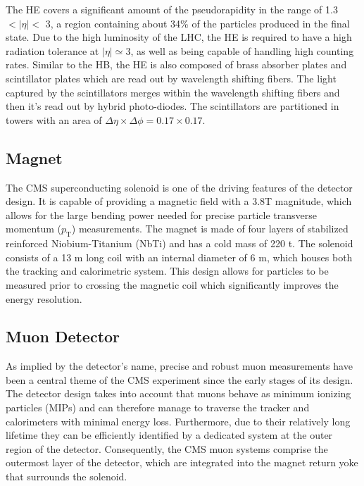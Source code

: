 The HE covers a significant amount of the pseudorapidity in the range of 1.3 $< |\eta| <$ 3, a region containing about 34\% of the particles produced in the final state. Due to the high luminosity of the LHC, the HE is required to have a high radiation tolerance at $|\eta| \simeq 3$, as well as being capable of handling high counting rates. Similar to the HB, the HE is also composed of brass absorber plates and scintillator plates which are read out by wavelength shifting fibers. The light captured by the scintillators merges within the wavelength shifting fibers and then it's read out by hybrid photo-diodes. The scintillators are partitioned in towers with an area of $\Delta\eta\times\Delta\phi = 0.17\times0.17$.\\

\subsection{Magnet}

The CMS superconducting solenoid is one of the driving features of the detector design. It is capable of providing a magnetic field with a 3.8T magnitude, which allows for the large bending power needed for  precise particle transverse momentum ($p_{\text{T}}$) measurements. The magnet is made of four layers of stabilized reinforced Niobium-Titanium (NbTi) and has a cold mass of 220 t. The solenoid consists of a 13 m long coil with an internal diameter of 6 m, which houses both the tracking and calorimetric system. This design allows for particles to be measured prior to crossing the magnetic coil which significantly improves the energy resolution. 

\subsection{Muon Detector}

 As implied by the detector's name, precise and robust muon measurements have been a central theme of the CMS experiment since the early stages of its design. The detector design takes into account that muons behave as minimum ionizing particles (MIPs)\cite{MIPs} and can therefore manage to traverse
the tracker and calorimeters with minimal energy loss. Furthermore, due to their relatively long lifetime they can be efficiently identified by a dedicated system at the outer region of the detector. Consequently, the CMS muon systems comprise the outermost layer of the detector, which are integrated into the magnet return yoke that surrounds the solenoid.\\

